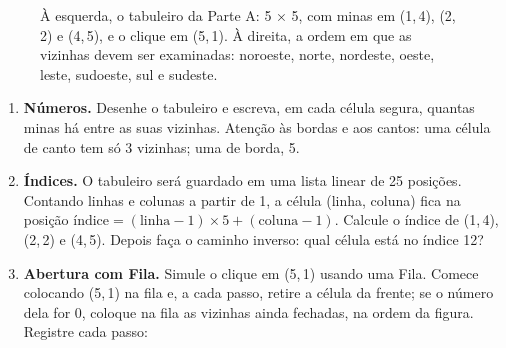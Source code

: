\documentclass[11pt]{article}
\newcommand{\minaTikz}[2]{%
  \begin{scope}[shift={(#1-0.5, 5.5-#2)}]
    \foreach \a in {0,45,90,135} \draw[edtexto, line width=1.1pt] (\a:0.3) -- (\a+180:0.3);
    \fill[edtexto] (0,0) circle (0.19);
    \fill[white] (-0.07,0.07) circle (0.045);
  \end{scope}}
\begin{document}
\begin{figure}[H]
\centering
{}
\caption{À esquerda, o tabuleiro da Parte A: 5 × 5, com minas em (1,\,4), (2,\,2) e (4,\,5), e o
clique em (5,\,1). À direita, a ordem em que as vizinhas devem ser examinadas:
noroeste, norte, nordeste, oeste, leste, sudoeste, sul e sudeste.}
\end{figure}

\begin{enumerate}[label={\color{edverde}\bfseries A\arabic*.}, leftmargin=2.2em]
  \item \textbf{Números.} Desenhe o tabuleiro e escreva, em cada célula segura, quantas minas há
        entre as suas vizinhas. Atenção às bordas e aos cantos: uma célula de canto tem só 3
        vizinhas; uma de borda, 5.
  \item \textbf{Índices.} O tabuleiro será guardado em uma lista linear de 25 posições. Contando
        linhas e colunas a partir de 1, a célula (linha, coluna) fica na posição
        $\text{índice} = (\text{linha} - 1) \times 5 + (\text{coluna} - 1)$.
        Calcule o índice de (1,\,4), (2,\,2) e (4,\,5). Depois faça o caminho inverso: qual célula
        está no índice 12?
  \item \textbf{Abertura com Fila.} Simule o clique em (5,\,1) usando uma Fila. Comece colocando
        (5,\,1) na fila e, a cada passo, retire a célula da frente; se o número dela for 0,
        coloque na fila as vizinhas ainda fechadas, na ordem da figura. Registre cada passo:
\end{enumerate}
\end{document}

